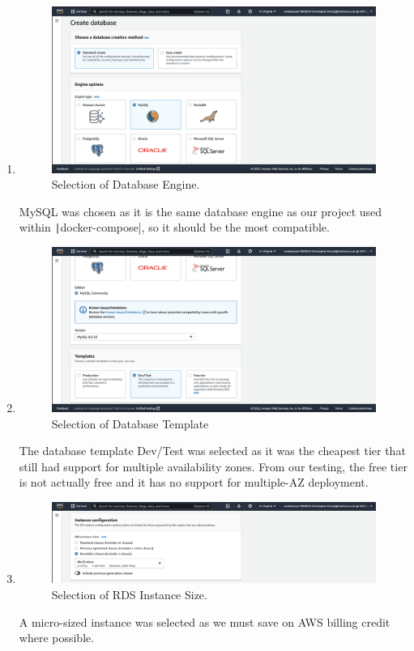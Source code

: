 \begin{enumerate}
    \item
    \begin{figure}[H]
        \centering
        \includegraphics[width=\textwidth]{resources/rds/rds-create-engine}
        \caption{Selection of Database Engine.}
        \label{fig:rds-engine}
    \end{figure}
    MySQL was chosen as it is the same database engine as our project used within \texttt|docker-compose|, so it should be the most compatible.

    \item
    \begin{figure}[H]
        \centering
        \includegraphics[width=\textwidth]{resources/rds/rds-templates}
        \caption{Selection of Database Template}
        \label{fig:rds-templates}
    \end{figure}
    The database template Dev/Test was selected as it was the cheapest tier that still had support for multiple availability zones. From our testing, the free tier is not actually free and it has no support for multiple-AZ deployment.

    \item
    \begin{figure}[H]
        \centering
        \includegraphics[width=\textwidth]{resources/rds/rds-instance-config}
        \caption{Selection of RDS Instance Size.}
        \label{fig:rds-instance-conf}
    \end{figure}
    A micro-sized instance was selected as we must save on AWS billing credit where possible.


\end{enumerate}

